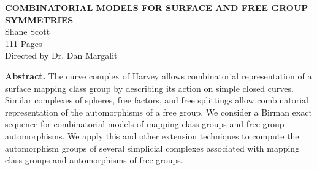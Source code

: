 \documentclass[12pt]{report}   %
\begin{document}

\newcommand{\thesisTitle}{Combinatorial Models for Surface and Free Group Symmetries}
\newcommand{\yourName}{Shane Scott}
\newcommand{\yourSchool}{School of Mathematics}
\newcommand{\yourMonth}{December}
\newcommand{\yourYear}{2018}

\begin{center}

\begin{singlespacing}

\textbf{\MakeUppercase{\thesisTitle}}\\
\vspace{1\baselineskip}
\yourName\\
\vspace{1\baselineskip}
111 Pages\\
\vspace{1\baselineskip}
Directed by Dr. Dan Margalit\\
\vspace{3\baselineskip}
\end{singlespacing}
\end{center}

\doublespacing
\noindent \textbf{Abstract.} The curve complex of Harvey allows combinatorial representation of a surface
mapping class group by describing its action on simple closed curves.
Similar complexes of spheres, free factors, and free splittings allow
combinatorial representation of the automorphisms of a free group.
We consider a Birman exact sequence for combinatorial models of
mapping class groups and free group automorphisms.
We apply this and other extension techniques to compute the
automorphism groups of several simplicial complexes associated
with mapping class groups and automorphisms of free groups.
\end{document}
